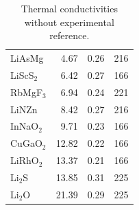\begin{table}[ht]
\begin{tabular}{lrrr}
     LiAsMg &             4.67 &       0.26 &          216 \\
  LiScS$_2$ &             6.42 &       0.27 &          166 \\
  RbMgF$_3$ &             6.94 &       0.24 &          221 \\
      LiNZn &             8.42 &       0.27 &          216 \\
  InNaO$_2$ &             9.71 &       0.23 &          166 \\
  CuGaO$_2$ &            12.82 &       0.22 &          166 \\
  LiRhO$_2$ &            13.37 &       0.21 &          166 \\
    Li$_2$S &            13.85 &       0.31 &          225 \\
    Li$_2$O &            21.39 &       0.29 &          225 \\
\bottomrule
\end{tabular}
  \caption{Thermal conductivities without experimental reference.}
  \label{tab:kappa.noexp}
\end{table}